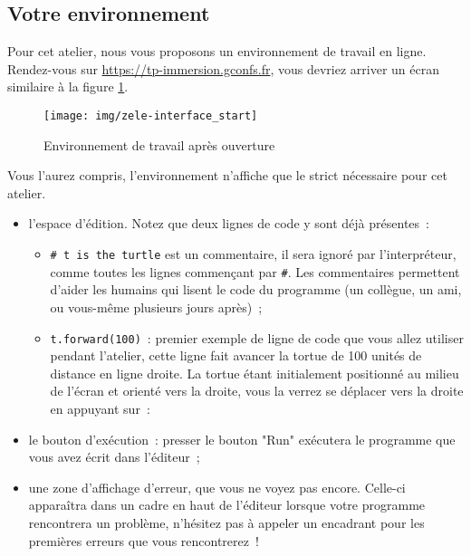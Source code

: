 \documentclass[11pt,a4paper]{article}
\begin{document}
\subsection{Votre environnement}

Pour cet atelier, nous vous proposons un environnement de travail en ligne.
Rendez-vous sur \url{https://tp-immersion.gconfs.fr}, vous devriez arriver un
écran similaire à la figure \ref{fig:zeleinterfacestart}.

\begin{figure}
    \centering
    \texttt{[image: img/zele-interface\_start]}
    \caption{Environnement de travail après ouverture}
    \label{fig:zeleinterfacestart}
\end{figure}

Vous l'aurez compris, l'environnement n'affiche que le strict nécessaire pour
cet atelier.

\begin{itemize}
    \item l'espace d'édition. Notez que deux lignes de code y sont déjà
        présentes~:
        \begin{itemize}
            \item \lstinline{# t is the turtle} est un commentaire, il sera
                ignoré par l'interpréteur, comme toutes les lignes commençant
                par \lstinline{#}.  Les commentaires permettent d'aider les
                humains qui lisent le code du programme (un collègue, un ami, ou
                vous-même plusieurs jours après)~;
            \item \lstinline{t.forward(100)}~: premier exemple de ligne de code
                que vous allez utiliser pendant l'atelier, cette ligne fait
                avancer la tortue de 100 unités de distance en ligne droite. La
                tortue étant initialement positionné au milieu de l'écran et
                orienté vers la droite, vous la verrez se déplacer vers la
                droite en appuyant sur~:
        \end{itemize}
    \item le bouton d'exécution~: presser le bouton "Run" exécutera le programme
        que vous avez écrit dans l'éditeur~;
    \item une zone d'affichage d'erreur, que vous ne voyez pas encore. Celle-ci
        apparaîtra dans un cadre en haut de l'éditeur lorsque votre programme
        rencontrera un problème, n'hésitez pas à appeler un encadrant pour les
        premières erreurs que vous rencontrerez~!
\end{itemize}
\end{document}
